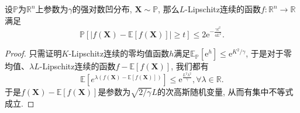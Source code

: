 \begin{theorem}
	设$\mathbb{P}$为$\mathbb{R}^n$上参数为$\gamma$的强对数凹分布, $\bm{X} \sim \mathbb{P}$, 那么$L$-Lipschitz连续的函数$f \colon \mathbb{R}^n \to \mathbb{R}$满足
	\begin{equation*}
		\mathbb{P}[|f(\bm{X}) - \mathbb{E}[f(\bm{X})]| \geq t]
		\leq 2 \mathrm{e}^{- \frac{\gamma t^2}{4 L^2}}.
	\end{equation*}
\end{theorem}
\begin{proof}
	只需证明$K$-Lipschitz连续的零均值函数$h$满足$\mathbb{E}_{\mathbb{P}}[\mathrm{e}^{h}] \leq \mathrm{e}^{K^2 / \gamma}$, 于是对于零均值、$\lambda L$-Lipschitz连续的函数$f - \mathbb{E}[f(\bm{X})]$, 我们都有
	\begin{equation*}
		\mathbb{E}[e^{\lambda(f(\bm{X}) - \mathbb{E}[f(\bm{X})])}] 
		\leq \mathrm{e}^{\frac{L^2 \lambda^2}{\gamma}}, 
		\forall \lambda \in \mathbb{R}.
	\end{equation*}
	于是$f(\bm{X}) - \mathbb{E}[f(\bm{X})]$是参数为$\sqrt{2 / \gamma} L$的次高斯随机变量, 从而有集中不等式成立. 
	

\end{proof}
